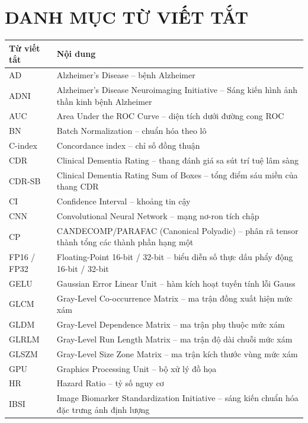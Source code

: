 \chapter*{DANH MỤC TỪ VIẾT TẮT}

{\renewcommand{\baselinestretch}{1.10}\small
\renewcommand{\arraystretch}{1.0}
\begin{longtable}{@{}L{2.5cm}L{12.7cm}@{}}
\toprule
Từ viết tắt & Nội dung \\
\midrule
\endhead
AD & Alzheimer's Disease -- bệnh Alzheimer \\
ADNI & Alzheimer's Disease Neuroimaging Initiative -- Sáng kiến hình ảnh thần kinh bệnh Alzheimer \\
AUC & Area Under the ROC Curve -- diện tích dưới đường cong ROC \\
BN & Batch Normalization -- chuẩn hóa theo lô \\
C-index & Concordance index -- chỉ số đồng thuận \\
CDR & Clinical Dementia Rating -- thang đánh giá sa sút trí tuệ lâm sàng \\
CDR-SB & Clinical Dementia Rating Sum of Boxes -- tổng điểm sáu miền của thang CDR \\
CI & Confidence Interval -- khoảng tin cậy \\
CNN & Convolutional Neural Network -- mạng nơ-ron tích chập \\
CP & CANDECOMP/PARAFAC (Canonical Polyadic) -- phân rã tensor thành tổng các thành phần hạng một \\
FP16 / FP32 & Floating-Point 16-bit / 32-bit -- biểu diễn số thực dấu phẩy động 16-bit / 32-bit \\
GELU & Gaussian Error Linear Unit -- hàm kích hoạt tuyến tính lỗi Gauss \\
GLCM & Gray-Level Co-occurrence Matrix -- ma trận đồng xuất hiện mức xám \\
GLDM & Gray-Level Dependence Matrix -- ma trận phụ thuộc mức xám \\
GLRLM & Gray-Level Run Length Matrix -- ma trận độ dài chuỗi mức xám \\
GLSZM & Gray-Level Size Zone Matrix -- ma trận kích thước vùng mức xám \\
GPU & Graphics Processing Unit -- bộ xử lý đồ họa \\
HR & Hazard Ratio -- tỷ số nguy cơ \\
IBSI & Image Biomarker Standardization Initiative -- sáng kiến chuẩn hóa đặc trưng ảnh định lượng \\

\end{longtable}}

